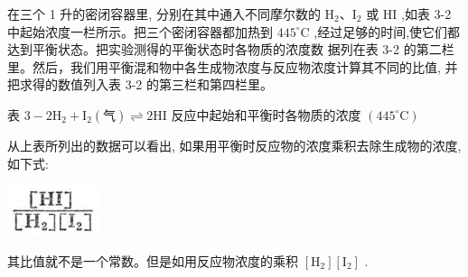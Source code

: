 \documentclass[10pt]{article}
\begin{document}
在三个 1 升的密闭容器里, 分别在其中通入不同摩尔数的 \({\mathrm{H}}_{2}\text{、}{\mathrm{I}}_{2}\) 或 \(\mathrm{{HI}}\) ,如表 3-2 中起始浓度一栏所示。把三个密闭容器都加热到 \({445}^{ \circ }\mathrm{C}\) ,经过足够的时间,使它们都达到平衡状态。把实验测得的平衡状态时各物质的浓度数 据列在表 3-2 的第二栏里。然后，我们用平衡混和物中各生成物浓度与反应物浓度计算其不同的比值, 并把求得的数值列入表 3-2 的第三栏和第四栏里。

表 \(3 - 2{\mathrm{H}}_{2} + {\mathrm{I}}_{2}\left( \text{气}\right) \rightleftharpoons 2\mathrm{{HI}}\) 反应中起始和平衡时各物质的浓度 \(\left( {{445}^{ \circ }\mathrm{C}}\right)\)

\begin{center}
\end{center}

从上表所列出的数据可以看出, 如果用平衡时反应物的浓度乘积去除生成物的浓度, 如下式:

\begin{center}
\includegraphics[max width=0.2\textwidth]{images/01912d13-9986-7822-a012-3f3f7be99dcb_80_469735.jpg}
\end{center}

其比值就不是一个常数。但是如用反应物浓度的乘积 \(\left\lbrack {\mathrm{H}}_{2}\right\rbrack \left\lbrack {\mathrm{I}}_{2}\right\rbrack\) .
\end{document}
